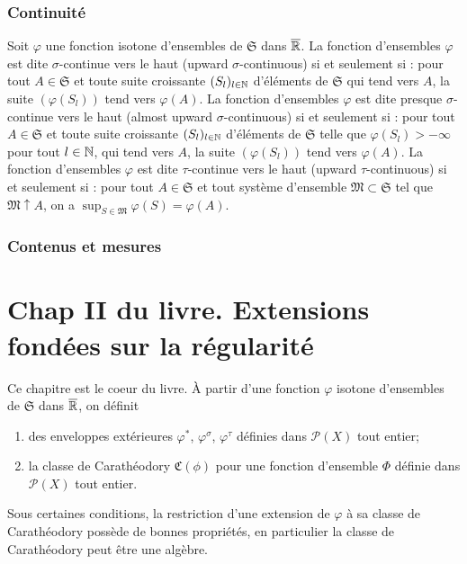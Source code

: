 \subsubsection{Continuité} \label{Continuite}
Soit $\varphi$ une fonction isotone d'ensembles de $\mathfrak{S}$ dans $\overline{\mathbb{R}}$.\newline
La fonction d'ensembles $\varphi$ est dite $\sigma$-continue vers le haut (upward $\sigma$-continuous) si et seulement si : pour tout $A \in \mathfrak{S}$ et toute suite croissante $(S_l)_{l\in \mathbb{N}}$ d'éléments de $\mathfrak{S}$ qui tend vers $A$, la suite $(\varphi(S_l))$ tend vers $\varphi(A)$.\newline
La fonction d'ensembles $\varphi$ est dite presque $\sigma$-continue vers le haut (almost upward $\sigma$-continuous) si et seulement si : pour tout $A \in \mathfrak{S}$ et toute suite croissante $(S_l)_{l\in \mathbb{N}}$ d'éléments de $\mathfrak{S}$ telle que $\varphi(S_l)> - \infty$ pour tout $l\in \mathbb{N}$, qui tend vers $A$, la suite $(\varphi(S_l))$ tend vers $\varphi(A)$.\newline
La fonction d'ensembles $\varphi$ est dite $\tau$-continue vers le haut (upward $\tau$-continuous) si et seulement si :
pour tout $A \in \mathfrak{S}$ et tout système d'ensemble $\mathfrak{M} \subset \mathfrak{S}$ tel que $\mathfrak{M} \uparrow A$, on a $\sup_{S \in \mathfrak{M}}\varphi(S) = \varphi(A)$.

\subsubsection{Contenus et mesures} \label{ContenusMesures}

\section{Chap II du livre. Extensions fondées sur la régularité}\label{ExtenRegul}
Ce chapitre est le coeur du livre. À partir d'une fonction $\varphi$ isotone d'ensembles de $\mathfrak{S}$ dans $\overline{\mathbb{R}}$, on définit
\begin{enumerate}
 \item des enveloppes extérieures $\varphi^*$, $\varphi^\sigma$, $\varphi^\tau$ définies dans $\mathcal{P}(X)$ tout entier;
 \item la classe de Carathéodory $\mathfrak{C}(\phi)$ pour une fonction d'ensemble $\Phi$ définie dans $\mathcal{P}(X)$ tout entier.
\end{enumerate}
Sous certaines conditions, la restriction d'une extension de $\varphi$ à sa classe de Carathéodory possède de bonnes propriétés, en particulier la classe de Carathéodory peut être une algèbre.

